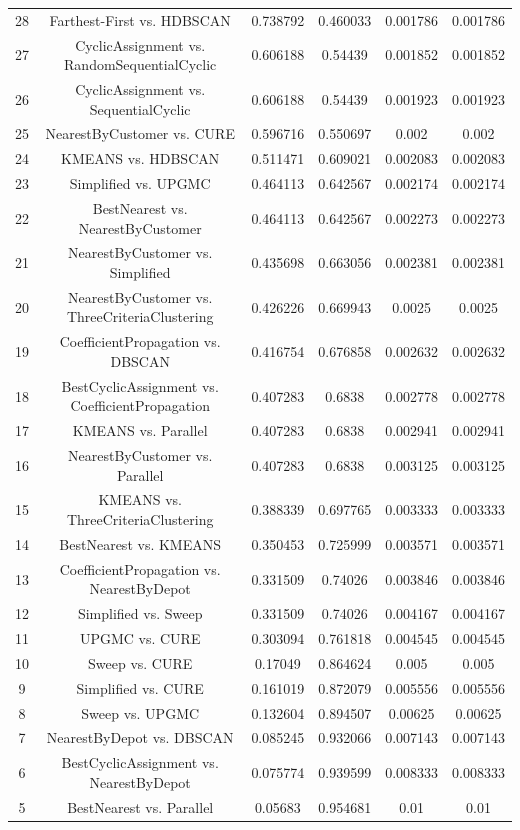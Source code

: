 \documentclass[a4paper,10pt]{article}
\begin{document}
\begin{landscape}
\begin{table}[!htp]
\begin{tabular}{cccccc}
28&Farthest-First vs. HDBSCAN&0.738792&0.460033&0.001786&0.001786\\
27&CyclicAssignment vs. RandomSequentialCyclic&0.606188&0.54439&0.001852&0.001852\\
26&CyclicAssignment vs. SequentialCyclic&0.606188&0.54439&0.001923&0.001923\\
25&NearestByCustomer vs. CURE&0.596716&0.550697&0.002&0.002\\
24&KMEANS vs. HDBSCAN&0.511471&0.609021&0.002083&0.002083\\
23&Simplified vs. UPGMC&0.464113&0.642567&0.002174&0.002174\\
22&BestNearest vs. NearestByCustomer&0.464113&0.642567&0.002273&0.002273\\
21&NearestByCustomer vs. Simplified&0.435698&0.663056&0.002381&0.002381\\
20&NearestByCustomer vs. ThreeCriteriaClustering&0.426226&0.669943&0.0025&0.0025\\
19&CoefficientPropagation vs. DBSCAN&0.416754&0.676858&0.002632&0.002632\\
18&BestCyclicAssignment vs. CoefficientPropagation&0.407283&0.6838&0.002778&0.002778\\
17&KMEANS vs. Parallel&0.407283&0.6838&0.002941&0.002941\\
16&NearestByCustomer vs. Parallel&0.407283&0.6838&0.003125&0.003125\\
15&KMEANS vs. ThreeCriteriaClustering&0.388339&0.697765&0.003333&0.003333\\
14&BestNearest vs. KMEANS&0.350453&0.725999&0.003571&0.003571\\
13&CoefficientPropagation vs. NearestByDepot&0.331509&0.74026&0.003846&0.003846\\
12&Simplified vs. Sweep&0.331509&0.74026&0.004167&0.004167\\
11&UPGMC vs. CURE&0.303094&0.761818&0.004545&0.004545\\
10&Sweep vs. CURE&0.17049&0.864624&0.005&0.005\\
9&Simplified vs. CURE&0.161019&0.872079&0.005556&0.005556\\
8&Sweep vs. UPGMC&0.132604&0.894507&0.00625&0.00625\\
7&NearestByDepot vs. DBSCAN&0.085245&0.932066&0.007143&0.007143\\
6&BestCyclicAssignment vs. NearestByDepot&0.075774&0.939599&0.008333&0.008333\\
5&BestNearest vs. Parallel&0.05683&0.954681&0.01&0.01\\

\end{tabular}
\end{table}
\end{landscape}
\end{document}

